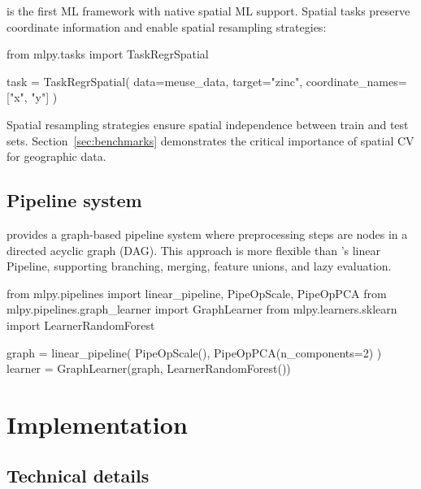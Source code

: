 \documentclass[article]{jss}
\begin{document}
 is the first  ML framework with native spatial ML support. Spatial tasks preserve coordinate information and enable spatial resampling strategies:

\begin{CodeChunk}
\begin{CodeInput}
from mlpy.tasks import TaskRegrSpatial

task = TaskRegrSpatial(
    data=meuse_data,
    target="zinc",
    coordinate_names=["x", "y"]
)
\end{CodeInput}
\end{CodeChunk}

Spatial resampling strategies ensure spatial independence between train and test sets. Section~\ref{sec:benchmarks} demonstrates the critical importance of spatial CV for geographic data.

\subsection{Pipeline system}

 provides a graph-based pipeline system where preprocessing steps are nodes in a directed acyclic graph (DAG). This approach is more flexible than 's linear Pipeline, supporting branching, merging, feature unions, and lazy evaluation.

\begin{CodeChunk}
\begin{CodeInput}
from mlpy.pipelines import linear_pipeline, PipeOpScale, PipeOpPCA
from mlpy.pipelines.graph_learner import GraphLearner
from mlpy.learners.sklearn import LearnerRandomForest

graph = linear_pipeline(
    PipeOpScale(),
    PipeOpPCA(n_components=2)
)
learner = GraphLearner(graph, LearnerRandomForest())
\end{CodeInput}
\end{CodeChunk}



\section{Implementation} \label{sec:implementation}

\subsection{Technical details}
\end{document}
